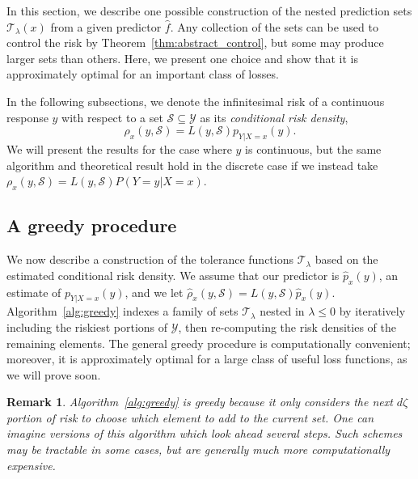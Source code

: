 \documentclass[10pt]{article}
\newtheorem{remark}{Remark}
\newcommand{\Y}{\mathcal{Y}}
\newcommand{\T}{\mathcal{T}}
\renewcommand{\S}{\mathcal{S}}
\begin{document}
In this section, we describe one possible construction of the nested prediction sets $\T_{\lambda}(x)$ from a given predictor $\hat{f}$. 
Any collection of the sets can be used to control the risk by Theorem~\ref{thm:abstract_control}, but some may produce larger sets than others. Here, we present one choice and show that it is approximately optimal for an important class of losses.

In the following subsections, we denote the infinitesimal risk of a continuous response $y$ with respect to a set $\S\subseteq\Y$ as its {\em conditional risk density},
\begin{equation}
    \rho_{x}(y,\S)=L(y,\S)p_{Y|X=x}(y).
\end{equation}
We will present the results for the case where $y$ is continuous, but the same algorithm and theoretical result hold in the discrete case if we instead take $\rho_x(y,\S)=L(y,\S)P(Y=y|X=x)$.

\subsection{A greedy procedure}
\label{sec:greedy-algorithm}
We now describe a construction of the tolerance functions $\T_\lambda$ based on the estimated conditional risk density.
We assume that our predictor is $\hat{p}_x(y)$, an estimate of $p_{Y|X=x}(y)$, and we let $\hat{\rho}_x(y,\S) = L(y,\S)\hat{p}_x(y)$.
Algorithm~\ref{alg:greedy} indexes a family of sets $\T_{\lambda}$ nested in $\lambda\le 0$ by iteratively including the riskiest portions of $\Y$, then re-computing the risk densities of the remaining elements.
The general greedy procedure is computationally convenient; moreover, it is approximately optimal for a large class of useful loss functions, as we will prove soon.



\begin{remark}
    Algorithm~\ref{alg:greedy} is greedy because it only considers the next $d\zeta$ portion of risk to choose which element to add to the current set. One can imagine versions of this algorithm which look ahead several steps. Such schemes may be tractable in some cases, but are generally much more computationally expensive.
\end{remark}
%
\end{document}
